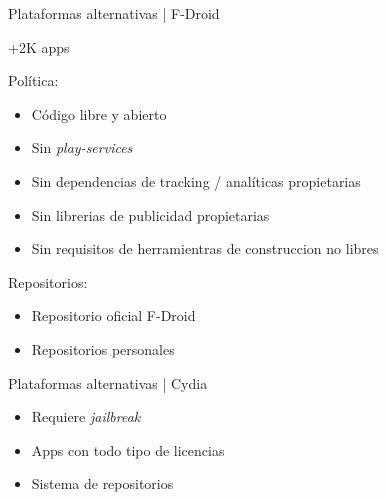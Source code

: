 \begin{frame}{Plataformas alternativas | F-Droid}

+2K apps

Política:

\begin{itemize}
    \item Código libre y abierto
    \item Sin \textit{play-services}
    \item Sin dependencias de tracking / analíticas propietarias
    \item Sin librerias de publicidad propietarias
    \item Sin requisitos de herramientras de construccion no libres
\end{itemize}

Repositorios:

\begin{itemize}
    \item Repositorio oficial F-Droid
    \item Repositorios personales
\end{itemize}

\end{frame}

\begin{frame}{Plataformas alternativas | Cydia}

\begin{itemize}
    \item Requiere \textit{jailbreak}
    \item Apps con todo tipo de licencias
    \item Sistema de repositorios
\end{itemize}

\end{frame}
